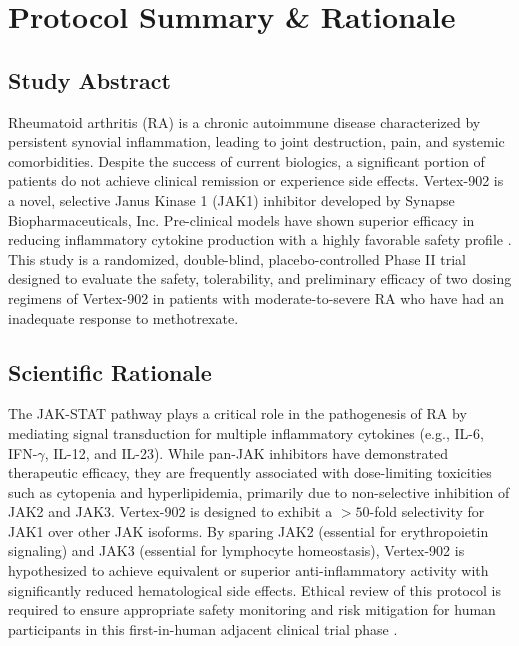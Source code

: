 \section{Protocol Summary \& Rationale}

\subsection{Study Abstract}
Rheumatoid arthritis (RA) is a chronic autoimmune disease characterized by persistent synovial inflammation, leading to joint destruction, pain, and systemic comorbidities. Despite the success of current biologics, a significant portion of patients do not achieve clinical remission or experience side effects. Vertex-902 is a novel, selective Janus Kinase 1 (JAK1) inhibitor developed by Synapse Biopharmaceuticals, Inc. Pre-clinical models have shown superior efficacy in reducing inflammatory cytokine production with a highly favorable safety profile \cite{vance2025vertex}. This study is a randomized, double-blind, placebo-controlled Phase II trial designed to evaluate the safety, tolerability, and preliminary efficacy of two dosing regimens of Vertex-902 in patients with moderate-to-severe RA who have had an inadequate response to methotrexate.

\subsection{Scientific Rationale}
The JAK-STAT pathway plays a critical role in the pathogenesis of RA by mediating signal transduction for multiple inflammatory cytokines (e.g., IL-6, IFN-$\gamma$, IL-12, and IL-23). While pan-JAK inhibitors have demonstrated therapeutic efficacy, they are frequently associated with dose-limiting toxicities such as cytopenia and hyperlipidemia, primarily due to non-selective inhibition of JAK2 and JAK3. Vertex-902 is designed to exhibit a $>50$-fold selectivity for JAK1 over other JAK isoforms. By sparing JAK2 (essential for erythropoietin signaling) and JAK3 (essential for lymphocyte homeostasis), Vertex-902 is hypothesized to achieve equivalent or superior anti-inflammatory activity with significantly reduced hematological side effects. Ethical review of this protocol is required to ensure appropriate safety monitoring and risk mitigation for human participants in this first-in-human adjacent clinical trial phase \cite{jones2024ethics}.

